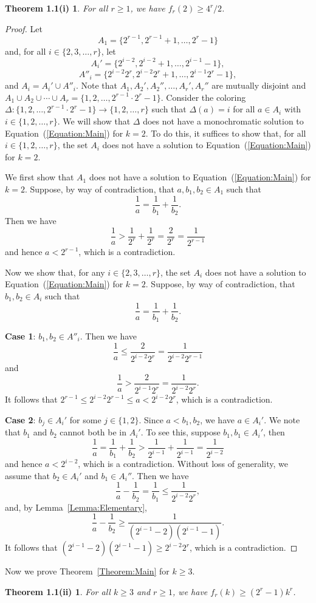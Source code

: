 \documentclass[10pt,a4paper]{amsart}
\newtheorem*{thm1.1PartI}{Theorem 1.1(i)}
\newtheorem*{thm1.1PartII}{Theorem 1.1(ii)}
\begin{document}
\begin{thm1.1PartI}\label{Lemma:CommonCoefficients_K=2}
    For all $r\geq1$, we have $f_r(2)\geq4^r/2$.
\end{thm1.1PartI}
\begin{proof}
Let
\[
A_1=\{2^{r-1},2^{r-1}+1,\ldots,2^r-1\}
\]
and, for all $i\in\{2,3,\ldots,r\}$, let 
\[
A_i'=\{2^{i-2},2^{i-2}+1,\ldots,2^{i-1}-1\},
\]    
\[
A''_i=\{2^{i-2}2^{r},2^{i-2}2^{r}+1,\ldots,2^{i-1}2^{r}-1\},
\]
and $A_i=A_i'\cup A''_i$. Note that $A_1,A_2',A_2'',\ldots,A_r',A_r''$ are mutually disjoint and $A_1\cup A_2\cup\cdots\cup A_r=\{1,2,\ldots,2^{r-1}\cdot2^r-1\}$. Consider the coloring $\Delta:\{1,2,\ldots,2^{r-1}\cdot2^r-1\}\to\{1,2,\ldots,r\}$ such that $\Delta(a)=i$ for all $a\in A_i$ with $i\in\{1,2,\ldots,r\}$. We will show that $\Delta$ does not have a monochromatic solution to Equation~(\ref{Equation:Main}) for $k=2$. To do this, it suffices to show that, for all $i\in\{1,2,\ldots,r\}$, the set $A_i$ does not have a solution to Equation~(\ref{Equation:Main}) for $k=2$.

We first show that $A_1$ does not have a solution to Equation~(\ref{Equation:Main}) for $k=2$. Suppose, by way of contradiction, that $a,b_1,b_2\in A_1$ such that
\[
\frac{1}{a}=\frac{1}{b_1}+\frac{1}{b_2}.
\]
Then we have
\[
\frac{1}{a}>\frac{1}{2^r}+\frac{1}{2^r}=\frac{2}{2^r}=\frac{1}{2^{r-1}}
\]
and hence $a<2^{r-1}$, which is a contradiction.

Now we show that, for any $i\in\{2,3,\ldots,r\}$, the set $A_i$ does not have a solution to Equation~(\ref{Equation:Main}) for $k=2$. Suppose, by way of contradiction, that $b_1,b_2\in A_i$ such that
\[
\frac{1}{a}=\frac{1}{b_1}+\frac{1}{b_2}.
\]

{\bf Case 1}: $b_1,b_2\in A''_i$. Then we have
\[
\frac{1}{a}\leq\frac{2}{2^{i-2}2^r}=\frac{1}{2^{i-2}2^{r-1}}
\]
and
\[
\frac{1}{a}>\frac{2}{2^{i-1}2^r}=\frac{1}{2^{i-2}2^r}.
\]
It follows that $2^{r-1}\leq 2^{i-2}2^{r-1}\leq a<2^{i-2}2^r$, which is a contradiction.

{\bf Case 2}: $b_j\in A_i'$ for some $j\in\{1,2\}$. Since $a<b_1,b_2$, we have $a\in A_i'$. We note that $b_1$ and $b_2$ cannot both be in $A_i'$. To see this, suppose $b_1,b_1\in A_i'$, then
\[
\frac{1}{a}=\frac{1}{b_1}+\frac{1}{b_2}>\frac{1}{2^{i-1}}+\frac{1}{2^{i-1}}=\frac{1}{2^{i-2}}
\]
and hence $a<2^{i-2}$, which is a contradiction. Without loss of generality, we assume that $b_2\in A_i'$ and $b_1\in A_i''$. Then we have
\[
\frac{1}{a}-\frac{1}{b_2}=\frac{1}{b_1}\leq \frac{1}{2^{i-2}2^r},
\]
and, by Lemma~\ref{Lemma:Elementary},
\[
\frac{1}{a}-\frac{1}{b_2}\geq\frac{1}{(2^{i-1}-2)(2^{i-1}-1)}.
\]
It follows that $(2^{i-1}-2)(2^{i-1}-1)\geq2^{i-2}2^r$, which is a contradiction.
\end{proof}
Now we prove Theorem~\ref{Theorem:Main} for $k\geq3$.
\begin{thm1.1PartII}\label{Lemma:CommonCoefficients_k>=3}
    For all $k\geq3$ and $r\geq1$, we have $f_r(k)\geq(2^r-1)k^r$.
\end{thm1.1PartII}
\end{document}

